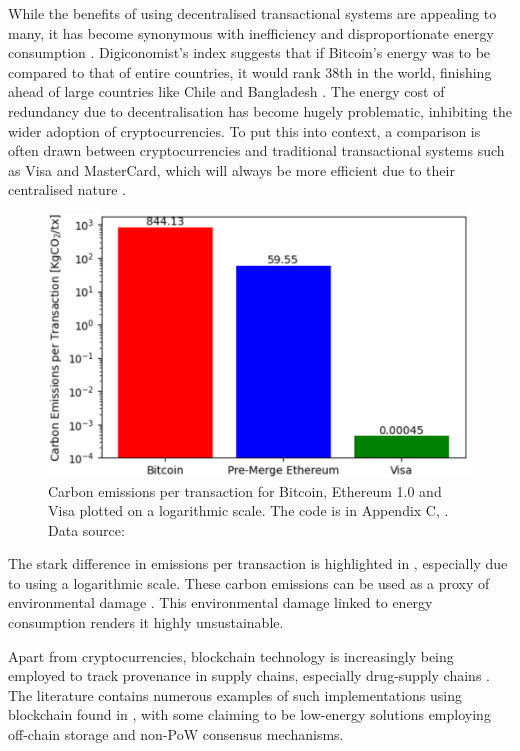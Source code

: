 While the benefits of using decentralised transactional systems are appealing to many, it has become synonymous with inefficiency and disproportionate energy consumption \cite{DeVriesBitcoinsProblem}. Digiconomist's index suggests that if Bitcoin's energy was to be compared to that of entire countries, it would rank 38th in the world, finishing ahead of large countries like Chile and Bangladesh \cite{BitcoinDigiconomist}. The energy cost of redundancy due to decentralisation has become hugely problematic, inhibiting the wider adoption of cryptocurrencies. To put this into context, a comparison is often drawn between cryptocurrencies and traditional transactional systems such as Visa and MasterCard, which will always be more efficient due to their centralised nature \cite{Kohli2023AnSolutions}.  

\begin{figure}[h]
    \centering
    \includegraphics[width=13cm,center]{Figures/CarbonEmissionsPlot.png}
    \caption{Carbon emissions per transaction for Bitcoin, Ethereum 1.0 and Visa plotted on a logarithmic scale. The code is in Appendix C, . Data source: \cite{Kohli2023AnSolutions} }
    \label{Figure:CarbonEmissionsPlot}
\end{figure}

The stark difference in emissions per transaction is highlighted in , especially due to using a logarithmic scale. These carbon emissions can be used as a proxy of environmental damage \cite{2022VisaReport}. This environmental damage linked to energy consumption renders it highly unsustainable.

Apart from cryptocurrencies, blockchain technology is increasingly being employed to track provenance in supply chains, especially drug-supply chains \cite{Labaran2021TheNigeria}. The literature contains numerous examples of such implementations using blockchain found in , with some claiming to be low-energy solutions employing off-chain storage and non-PoW consensus mechanisms.

